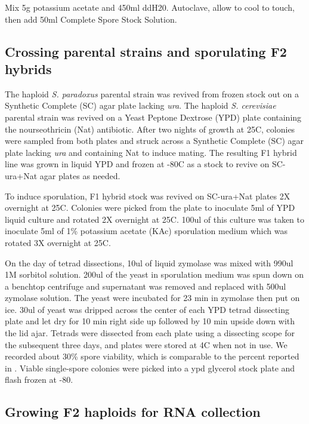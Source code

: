  Mix 5g potassium acetate and 450ml ddH20. Autoclave, allow to cool to touch, then add 50ml Complete Spore Stock Solution.

\subsection{Crossing parental strains and sporulating F2 hybrids}

The haploid \textit{S. paradoxus} parental strain was revived from frozen stock out on a Synthetic Complete (SC) agar plate lacking \textit{ura}. The haploid \textit{S. cerevisiae} parental strain was revived on a Yeast Peptone Dextrose (YPD) plate containing the nourseothricin (Nat) antibiotic. After two nights of growth at 25C, colonies were sampled from both plates and struck across a Synthetic Complete (SC) agar plate lacking \textit{ura} and containing Nat to induce mating. The resulting F1 hybrid line was grown in liquid YPD and frozen at -80C as a stock to revive on SC-ura+Nat agar plates as needed.

To induce sporulation, F1 hybrid stock was revived on SC-ura+Nat plates 2X overnight at 25C. Colonies were picked from the plate to inoculate 5ml of YPD liquid culture and rotated 2X overnight at 25C. 100ul of this culture was taken to inoculate 5ml of 1\% potassium acetate (KAc) sporulation medium which was rotated 3X overnight at 25C.

On the day of tetrad dissections, 10ul of liquid zymolase was mixed with 990ul 1M sorbitol solution. 200ul of the yeast in sporulation medium was spun down on a benchtop centrifuge and supernatant was removed and replaced with 500ul zymolase solution. The yeast were incubated for 23 min in zymolase then put on ice. 30ul of yeast was dripped across the center of each YPD tetrad dissecting plate and let dry for 10 min right side up followed by 10 min upside down with the lid ajar. Tetrads were dissected from each plate using a dissecting scope for the subsequent three days, and plates were stored at 4C when not in use. We recorded about 30\% spore viability, which is comparable to the percent reported in \cite{Bozdag2021}. Viable single-spore colonies were picked into a ypd glycerol stock plate and flash frozen at -80.

\subsection{Growing F2 haploids for RNA collection}

